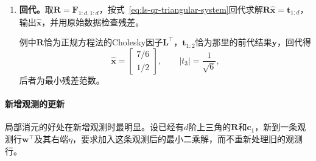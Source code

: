 \begin{enumerate}
 \item \textbf{回代。}取$\bm R=\bm F_{1:d,1:d}$，按式~\eqref{eq:ls-qr-triangular-system}回代求解$\bm R\hat{\bm x}=\bm t_{1:d}$，输出$\hat{\bm x}$，并用原始数据检查残差。

 例中$\bm R$恰为正规方程法的Cholesky因子$\bm L^\top$，$\bm t_{1:2}$恰为那里的前代结果$\bm y$，回代得
 \[
  \hat{\bm x}=\begin{bmatrix}7/6\\1/2\end{bmatrix},\qquad
  \lvert t_3\rvert=\frac1{\sqrt6},
 \]
 后者为最小残差范数。
\end{enumerate}

\paragraph{新增观测的更新}
局部消元的好处在新增观测时最明显。设已经有$d$阶上三角的$\bm R$和$\bm c_1$，新到一条观测行$\bm w^\top$及其右端$\eta$，要求加入这条观测后的最小二乘解，而不重新处理旧的观测行。

